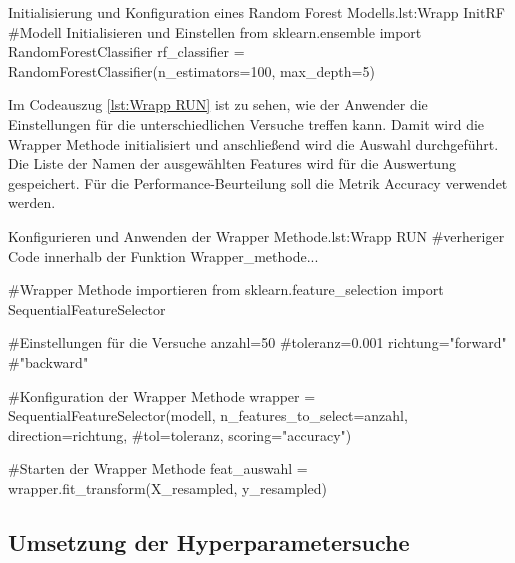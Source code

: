 \begin{pythoncode}{Initialisierung und Konfiguration eines Random Forest Modells.}{lst:Wrapp InitRF}
#Modell Initialisieren und Einstellen
from sklearn.ensemble import RandomForestClassifier
rf_classifier = RandomForestClassifier(n_estimators=100, 
                                       max_depth=5)
\end{pythoncode}

Im Codeauszug \ref{lst:Wrapp RUN} ist zu sehen, wie der Anwender die Einstellungen für die unterschiedlichen Versuche treffen kann. Damit wird die Wrapper Methode initialisiert und anschließend wird die Auswahl durchgeführt. Die Liste der Namen der ausgewählten Features wird für die Auswertung gespeichert. Für die Performance-Beurteilung soll die Metrik Accuracy verwendet werden.

\begin{pythoncode}{Konfigurieren und Anwenden der Wrapper Methode.}{lst:Wrapp RUN}
#verheriger Code innerhalb der Funktion Wrapper_methode...

#Wrapper Methode importieren
from sklearn.feature_selection import SequentialFeatureSelector

#Einstellungen für die Versuche
anzahl=50
#toleranz=0.001
richtung="forward" #"backward"

#Konfiguration der Wrapper Methode
wrapper = SequentialFeatureSelector(modell, 
                n_features_to_select=anzahl, 
                direction=richtung, 
                #tol=toleranz, 
                scoring="accuracy")

#Starten der Wrapper Methode
feat_auswahl = wrapper.fit_transform(X_resampled, y_resampled)
\end{pythoncode}



\subsection{Umsetzung der Hyperparametersuche}

